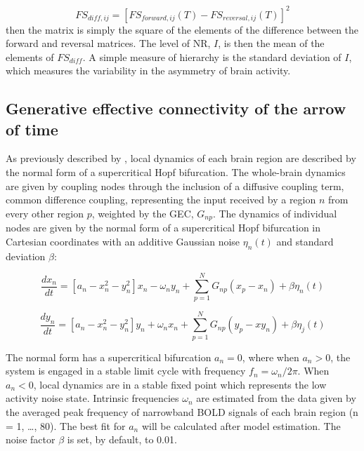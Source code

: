 \begin{equation}
FS_{diff,ij} = [FS_{forward,ij}(T) - FS_{reversal,ij}(T)]^2
\end{equation}
then the matrix is simply the square of the elements of the
difference between the forward and reversal matrices. The level of NR,
\(I\), is then the mean of the elements of \(FS_{diff}\). A simple
measure of hierarchy is the standard deviation of \(I\), which measures
the variability in the asymmetry of brain activity. 

\subsection{Generative effective connectivity of the arrow of time}
As previously described by \textcite{Kringelbach2023}, local dynamics of each brain region are described by
the normal form of a supercritical Hopf bifurcation. The whole-brain dynamics are given by coupling nodes through the
inclusion of a diffusive coupling term, common difference coupling,
representing the input received by a region \(n\) from every other
region \(p\), weighted by the GEC, \(G_{np}\). The dynamics of
individual nodes are given by the normal form of a supercritical Hopf
bifurcation in Cartesian coordinates with an additive Gaussian noise
\(\eta_n(t)\) and standard deviation \(\beta\):


\begin{equation}
\frac{dx_n}{dt} = [a_n - x^2_n - y^2_n]x_n - \omega_ny_n+\sum_{p=1}^N{G_{np}(x_p-x_n)} + \beta\eta_n(t)
\end{equation}

\begin{equation}
\frac{dy_n}{dt} = [a_n - x^2_n - y^2_n]y_n + \omega_nx_n+\sum_{p=1}^N{G_{np}(y_p-xy_n)} + \beta\eta_j(t)
\end{equation}


The normal form has a supercritical bifurcation \(a_n=0\), where when
\(a_n>0\), the system is engaged in a stable limit cycle with frequency
\(f_n = \omega_n/2\pi\). When \(a_n<0\), local dynamics are in a stable
fixed point which represents the low activity noise state. Intrinsic
frequencies \(\omega_n\) are estimated from the data given by the
averaged peak frequency of narrowband BOLD signals of each brain region
(n = 1, \ldots, 80). The best fit for \(a_n\) will be calculated after
model estimation. The noise factor \(\beta\) is set, by default, to
0.01.

